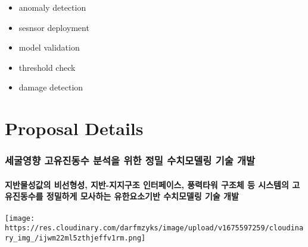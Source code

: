 \documentclass[
  letterpaper,
  DIV=11,
  numbers=noendperiod]{scrreprt}
\providecommand{\tightlist}{%
  \setlength{\itemsep}{0pt}\setlength{\parskip}{0pt}}\usepackage{longtable,booktabs,array}
\begin{document}
\begin{itemize}
\tightlist
\item
  anomaly detection
\item
  sesnsor deployment
\item
  model validation
\item
  threshold check
\item
  damage detection
\end{itemize}

\hypertarget{proposal-details-1}{%
\chapter{Proposal Details}\label{proposal-details-1}}

\hypertarget{uxc138uxad74uxc601uxd5a5-uxace0uxc720uxc9c4uxb3d9uxc218-uxbd84uxc11duxc744-uxc704uxd55c-uxc815uxbc00-uxc218uxce58uxbaa8uxb378uxb9c1-uxae30uxc220-uxac1cuxbc1c}{%
\subsection{세굴영향 고유진동수 분석을 위한 정밀 수치모델링 기술
개발}\label{uxc138uxad74uxc601uxd5a5-uxace0uxc720uxc9c4uxb3d9uxc218-uxbd84uxc11duxc744-uxc704uxd55c-uxc815uxbc00-uxc218uxce58uxbaa8uxb378uxb9c1-uxae30uxc220-uxac1cuxbc1c}}

\hypertarget{uxc9c0uxbc18uxbb3cuxc131uxac12uxc758-uxbe44uxc120uxd615uxc131-uxc9c0uxbc18-uxc9c0uxc9c0uxad6cuxc870-uxc778uxd130uxd398uxc774uxc2a4-uxd48duxb825uxd0c0uxc6cc-uxad6cuxc870uxccb4-uxb4f1-uxc2dcuxc2a4uxd15cuxc758-uxace0uxc720uxc9c4uxb3d9uxc218uxb97c-uxc815uxbc00uxd558uxac8c-uxbaa8uxc0acuxd558uxb294-uxc720uxd55cuxc694uxc18cuxae30uxbc18-uxc218uxce58uxbaa8uxb378uxb9c1-uxae30uxc220-uxac1cuxbc1c}{%
\subsubsection{지반물성값의 비선형성, 지반-지지구조 인터페이스, 풍력타워
구조체 등 시스템의 고유진동수를 정밀하게 모사하는 유한요소기반
수치모델링 기술
개발}\label{uxc9c0uxbc18uxbb3cuxc131uxac12uxc758-uxbe44uxc120uxd615uxc131-uxc9c0uxbc18-uxc9c0uxc9c0uxad6cuxc870-uxc778uxd130uxd398uxc774uxc2a4-uxd48duxb825uxd0c0uxc6cc-uxad6cuxc870uxccb4-uxb4f1-uxc2dcuxc2a4uxd15cuxc758-uxace0uxc720uxc9c4uxb3d9uxc218uxb97c-uxc815uxbc00uxd558uxac8c-uxbaa8uxc0acuxd558uxb294-uxc720uxd55cuxc694uxc18cuxae30uxbc18-uxc218uxce58uxbaa8uxb378uxb9c1-uxae30uxc220-uxac1cuxbc1c}}

\texttt{[image: https://res.cloudinary.com/darfmzyks/image/upload/v1675597259/cloudinary\_img\_/ijwm22ml5zthjeffv1rm.png]}
\end{document}

